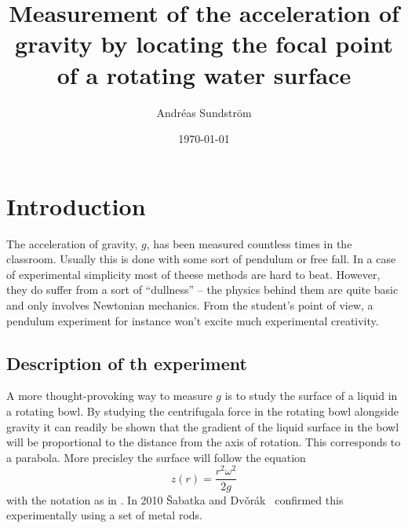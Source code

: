 \documentclass[11pt,towcolumn, swedish, english]{article}
\begin{document}
\title{Measurement of the acceleration of gravity by locating the
  focal point of a rotating water surface} 

\author{Andréas Sundström \footnotemark
}
\date{\today}




\section{Introduction}
The acceleration of gravity, $g$, has been measured countless times in the
classroom. Usually this is done with some sort of pendulum or free fall. In a
case of experimental simplicity most of theese methods are hard to
beat. 
However, they do suffer from a sort of ``dullness'' -- the
physics behind them are quite basic and only involves Newtonian
mechanics. From the student's point of view, a pendulum experiment for
instance won't excite much experimental creativity. 



\subsection{Description of th experiment }
A more thought-provoking way to measure $g$ is to study the surface of
a liquid in a rotating bowl. By studying the centrifugala force in the
rotating bowl alongside gravity it can readily be shown that the
gradient of the liquid surface in the bowl will be proportional to the
distance from the axis of rotation. This corresponds to a
parabola. More precisley the surface will follow the
equation~\cite{Sabatka2010, Berg1990} 
\begin{equation}\label{eq:parabola}
z(r)=\frac{r^2\omega^2}{2g}
\end{equation}
with the notation as in . In 2010 \v{S}abatka and
Dv\v{o}rák~\cite{Sabatka2010} confirmed this experimentally using a
set of metal rods. 
\end{document}
